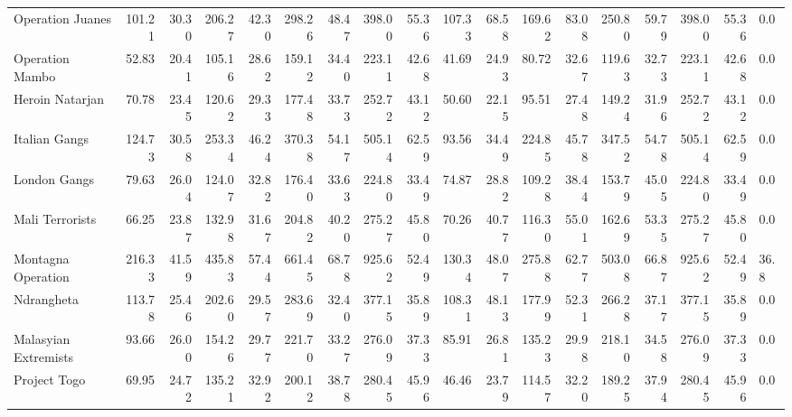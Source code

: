 \begin{tabular}{lrrrrrrrrrrrrrrrrl}
Operation Juanes     &            101.21 &  30.30 &  206.27 &  42.30 &  298.26 &  48.47 &  398.00 &  55.36 &           107.33 &   68.58 &  169.62 &   83.08 &  250.80 &   59.79 &  398.00 &  55.36 &        0.0 \\
Operation Mambo      &             52.83 &  20.41 &  105.16 &  28.62 &  159.12 &  34.40 &  223.11 &  42.68 &            41.69 &   24.93 &   80.72 &   32.67 &  119.63 &   32.73 &  223.11 &  42.68 &        0.0 \\
Heroin Natarjan      &             70.78 &  23.45 &  120.62 &  29.33 &  177.48 &  33.73 &  252.72 &  43.12 &            50.60 &   22.15 &   95.51 &   27.48 &  149.24 &   31.96 &  252.72 &  43.12 &        0.0 \\
Italian Gangs        &            124.73 &  30.58 &  253.34 &  46.24 &  370.38 &  54.17 &  505.14 &  62.59 &            93.56 &   34.49 &  224.85 &   45.78 &  347.52 &   54.78 &  505.14 &  62.59 &        0.0 \\
London Gangs         &             79.63 &  26.04 &  124.07 &  32.82 &  176.40 &  33.63 &  224.80 &  33.49 &            74.87 &   28.82 &  109.28 &   38.44 &  153.79 &   45.05 &  224.80 &  33.49 &        0.0 \\
Mali Terrorists      &             66.25 &  23.87 &  132.98 &  31.67 &  204.82 &  40.20 &  275.27 &  45.80 &            70.26 &   40.77 &  116.30 &   55.01 &  162.69 &   53.35 &  275.27 &  45.80 &        0.0 \\
Montagna Operation   &            216.33 &  41.59 &  435.83 &  57.44 &  661.45 &  68.78 &  925.62 &  52.49 &           130.34 &   48.07 &  275.88 &   62.77 &  503.08 &   66.87 &  925.62 &  52.49 &       36.8 \\
Ndrangheta           &            113.78 &  25.46 &  202.60 &  29.57 &  283.69 &  32.40 &  377.15 &  35.89 &           108.31 &   48.13 &  177.99 &   52.31 &  266.28 &   37.17 &  377.15 &  35.89 &        0.0 \\
Malasyian Extremists &             93.66 &  26.00 &  154.26 &  29.77 &  221.70 &  33.27 &  276.09 &  37.33 &            85.91 &   26.81 &  135.23 &   29.98 &  218.10 &   34.58 &  276.09 &  37.33 &        0.0 \\
Project Togo         &             69.95 &  24.72 &  135.21 &  32.92 &  200.12 &  38.78 &  280.45 &  45.96 &            46.46 &   23.79 &  114.57 &   32.20 &  189.25 &   37.94 &  280.45 &  45.96 &        0.0 \\
\bottomrule
\end{tabular}
